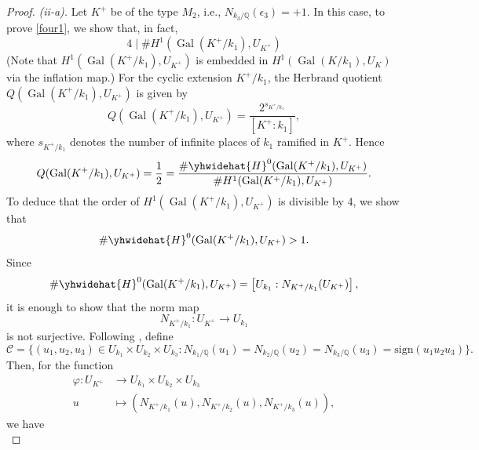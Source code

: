 \documentclass[12pt]{amsart}
\theoremstyle{definition}
\numberwithin{equation}{section}
\DeclareMathOperator{\Gal}{Gal}
\begin{document}
\begin{proof}
\smallskip
\textit{(ii-a).} 
			Let $K^+$ be of the type $M_2$, i.e., $N_{k_3/\mathbb{Q}}(\epsilon_3)=+1$. In this case, to prove \eqref{four1},
		we show that, in fact,
	\begin{equation*}
			4 \mid \# H^1(\Gal(K^+/k_1),U_{K^+})
	\end{equation*}
(Note that $H^1(\Gal(K^+/k_1),U_{K^+})$ is embedded in $H^1(\Gal(K/k_1),U_K)$ via the inflation map.) For the cyclic extension $K^+/k_1$, the Herbrand quotient $Q(\Gal(K^+/k_1),U_{K^+})$ is given by
\begin{equation*} 
	Q(\Gal(K^+/k_1),U_{K^+})=\frac{2^{s_{K^+/k_1}}}{[K^+:k_1]},
\end{equation*}
where $s_{K^+/k_1}$ denotes the number of infinite places of $k_1$ ramified in $K^+$. Hence
\begin{equation} \label{equation, Herbrand Quotient for K+/k1}
	Q(\Gal(K^+/k_1),U_{K^+})=\frac{1}{2}=\frac{\# \yhwidehat{H}^0(\Gal(K^+/k_1),U_{K^+})}{\# H^1(\Gal(K^+/k_1),U_{K^+})}.
\end{equation}
To deduce that the order of $ H^1(\Gal(K^+/k_1),U_{K^+})$ is divisible by $4$, we show that
\begin{equation*}
	 \# \yhwidehat{H}^0(\Gal(K^+/k_1),U_{K^+}) >1.
\end{equation*}
Since
\begin{equation*}
\# \yhwidehat{H}^0(\Gal(K^+/k_1),U_{K^+})=\left[U_{k_1}: N_{K^+/k_1}(U_{K^+})\right],
\end{equation*}
it is enough to show that the norm map
		\begin{equation*}
		N_{K^+/k_1}:U_{K^+} \rightarrow U_{k_1}
	\end{equation*} 
is not surjective.		
			Following \cite[p. 161]{Bennett}, define
		{\small 
			\begin{equation} \label{equation, the set C}
				\mathcal{C}=\{(u_1,u_2,u_3) \in U_{k_1} \times U_{k_2} \times U_{k_3} : N_{k_1/\mathbb{Q}}(u_1)=N_{k_2/\mathbb{Q}}(u_2)=N_{k_3/\mathbb{Q}}(u_3)=\text{sign}(u_1u_2u_3)\}.
		\end{equation}}
		Then, for the function
		\begin{align*} \label{equation, the norm function phi}
			\varphi : U_{K^+} & \rightarrow U_{k_1} \times U_{k_2} \times U_{k_3} \\ 
			u & \mapsto \left( N_{K^+/k_1}(u),N_{K^+/k_2}(u), N_{K^+/k_3}(u) \right), \nonumber
		\end{align*}
		we have
		\begin{equation} \label{equation, Im(phi) subset C}

\end{equation}
\end{proof}
\end{document}
